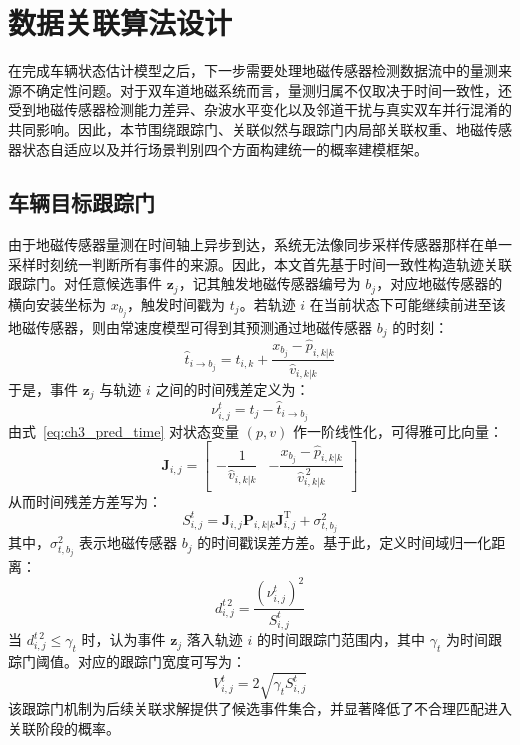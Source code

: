 \documentclass{xdupgthesis}
\begin{document}
\section{数据关联算法设计}
\label{sec:ch3_association}

在完成车辆状态估计模型之后，下一步需要处理地磁传感器检测数据流中的量测来源不确定性问题。对于双车道地磁系统而言，量测归属不仅取决于时间一致性，还受到地磁传感器检测能力差异、杂波水平变化以及邻道干扰与真实双车并行混淆的共同影响。因此，本节围绕跟踪门、关联似然与跟踪门内局部关联权重、地磁传感器状态自适应以及并行场景判别四个方面构建统一的概率建模框架。


\subsection{车辆目标跟踪门}

由于地磁传感器量测在时间轴上异步到达，系统无法像同步采样传感器那样在单一采样时刻统一判断所有事件的来源。因此，本文首先基于时间一致性构造轨迹关联跟踪门。对任意候选事件 $\mathbf z_j$，记其触发地磁传感器编号为 $b_j$，对应地磁传感器的横向安装坐标为 $x_{b_j}$，触发时间戳为 $t_j$。若轨迹 $i$ 在当前状态下可能继续前进至该地磁传感器，则由常速度模型可得到其预测通过地磁传感器 $b_j$ 的时刻：
\begin{equation}
	\hat t_{i\rightarrow b_j}
	=
	t_{i,k}+\frac{x_{b_j}-\hat p_{i,k|k}}{\hat v_{i,k|k}}
	\label{eq:ch3_pred_time}
\end{equation}
于是，事件 $\mathbf z_j$ 与轨迹 $i$ 之间的时间残差定义为：
\begin{equation}
	\nu^{t}_{i,j}=t_j-\hat t_{i\rightarrow b_j}
	\label{eq:ch3_time_residual}
\end{equation}
由式~\eqref{eq:ch3_pred_time} 对状态变量 $(p,v)$ 作一阶线性化，可得雅可比向量：
\begin{equation}
	\mathbf J_{i,j}
	=
	\begin{bmatrix}
		-\dfrac{1}{\hat v_{i,k|k}} & -\dfrac{x_{b_j}-\hat p_{i,k|k}}{\hat v_{i,k|k}^{\,2}}
	\end{bmatrix}
	\label{eq:ch3_time_jacobian}
\end{equation}
从而时间残差方差写为：
\begin{equation}
	S^{t}_{i,j}=\mathbf J_{i,j}\mathbf P_{i,k|k}\mathbf J_{i,j}^{\mathrm T}+\sigma_{t,b_j}^{2}
	\label{eq:ch3_time_var}
\end{equation}
其中，$\sigma_{t,b_j}^{2}$ 表示地磁传感器 $b_j$ 的时间戳误差方差。基于此，定义时间域归一化距离：
\begin{equation}
	d^{t\,2}_{i,j}=\frac{\left(\nu^{t}_{i,j}\right)^2}{S^{t}_{i,j}}
	\label{eq:ch3_time_maha}
\end{equation}
当 $d^{t\,2}_{i,j}\le \gamma_t$ 时，认为事件 $\mathbf z_j$ 落入轨迹 $i$ 的时间跟踪门范围内，其中 $\gamma_t$ 为时间跟踪门阈值。对应的跟踪门宽度可写为：
\begin{equation}
	V^{t}_{i,j}=2\sqrt{\gamma_t S^{t}_{i,j}}
	\label{eq:ch3_gate_width_time}
\end{equation}
该跟踪门机制为后续关联求解提供了候选事件集合，并显著降低了不合理匹配进入关联阶段的概率。
\end{document}
